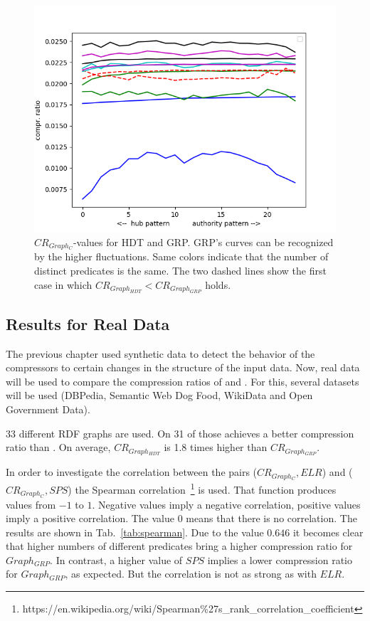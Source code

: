 \begin{figure}
	\centering
	\includegraphics[width=0.8\linewidth]{figures/GRPvsHDT/bothWithoutDictIncreasingPreds}
	\caption{$CR_{Graph_C}$-values for HDT and GRP. GRP's curves can be recognized by the higher fluctuations. Same colors indicate that the number of distinct predicates is the same. The two dashed lines show the first case in which $CR_{Graph_{HDT}} <CR_{Graph_{GRP}} $ holds.} 
	\label{fig:bothwithoutdictincreasingpreds}
\end{figure}


\subsection{Results for Real Data}

The previous chapter used synthetic data to detect the behavior of the compressors to certain changes in the structure of the input data. Now, real data will be used to compare the compression ratios of \GHDT{} and \GGRP{}. For this, several datasets will be used (DBPedia, Semantic Web Dog Food, WikiData and Open Government Data). 

33 different RDF  graphs are used. On 31 of those \GGRP{} achieves a better compression ratio than \GHDT{}. On average, $CR_{Graph_{HDT}}$ is 1.8 times higher than $CR_{Graph_{GRP}}$.

In order to investigate the correlation between the pairs ($CR_{Graph_C},ELR$) and ($CR_{Graph_C},SPS$) the Spearman correlation~\footnote{https://en.wikipedia.org/wiki/Spearman\%27s\_rank\_correlation\_coefficient} is used. That function produces values from $ -1 $ to $ 1 $. Negative values imply a negative correlation, positive values imply a positive correlation. The value 0 means that there is no correlation. The results are shown in Tab.~\ref{tab:spearman}. Due to the value $0.646$ it becomes clear that higher numbers of different predicates bring a higher compression ratio for $Graph_{GRP}$. In contrast, a higher value of $SPS$ implies a lower compression ratio for $Graph_{GRP}$, as expected. But the correlation is not as strong as with $ELR$. 

